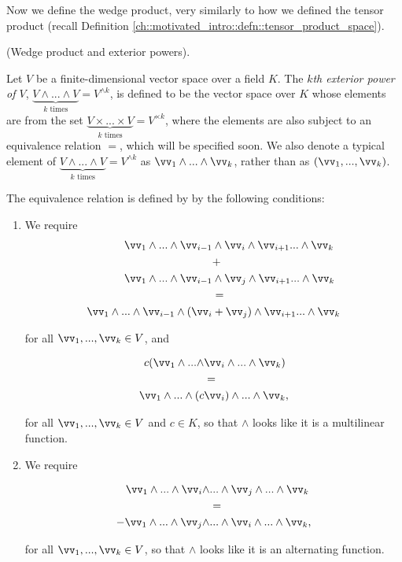 Now we define the wedge product, very similarly to how we defined the tensor product (recall Definition \ref{ch::motivated_intro::defn::tensor_product_space}).

\begin{defn}
    (Wedge product and exterior powers).
    
    Let $V$ be a finite-dimensional vector space over a field $K$. The \textit{$k$th exterior power of $V$}, $\underbrace{V \wedge ... \wedge V}_{\text{$k$ times}} = V^{\wedge k}$, is defined to be the vector space over $K$ whose elements are from the set $\underbrace{V \times ... \times V}_{\text{$k$ times}} = V^{\times k}$, where the elements are also subject to an equivalence relation $=$, which will be specified soon. We also denote a typical element of $\underbrace{V \wedge ... \wedge V}_{\text{$k$ times}} = V^{\wedge k}$ as $\vv_1 \wedge ... \wedge \vv_k$, rather than as $(\vv_1, ..., \vv_k)$. 
    
    The equivalence relation is defined by by the following conditions:
    
    \begin{enumerate}
        \item We require
        \begin{align*}
            \vv_1 \wedge ... \wedge \vv_{i - 1} &\wedge \vv_{i} \wedge \vv_{i + 1} ... \wedge \vv_k \\
            &+ \\
            \vv_1 \wedge ... \wedge \vv_{i - 1} &\wedge \vv_{j} \wedge \vv_{i + 1} ... \wedge \vv_k \\
            &= \\
            \vv_1 \wedge ... \wedge \vv_{i - 1} \wedge (\vv_{i} &+ \vv_{j}) \wedge \vv_{i + 1} ... \wedge \vv_k
        \end{align*}

        for all $\vv_1, ..., \vv_k \in V$, and
        
        \begin{align*}
            c (\vv_1 \wedge ... \wedge &\vv_i \wedge ... \wedge \vv_k ) \\
            &= \\
            \vv_1 \wedge ... \wedge (c &\vv_i) \wedge ... \wedge \vv_k,
        \end{align*}

        for all $\vv_1, ..., \vv_k \in V$ and $c \in K$, so that $\wedge$ looks like it is a multilinear function.

        \item We require

        \begin{align*}
            \vv_1 \wedge ... \wedge \vv_i \wedge &... \wedge \vv_j \wedge ... \wedge \vv_k \\
            &= \\
            -\vv_1 \wedge ... \wedge \vv_j \wedge &... \wedge \vv_i \wedge ... \wedge \vv_k,
        \end{align*}

        for all $\vv_1, ..., \vv_k \in V$, so that $\wedge$ looks like it is an alternating function.
    \end{enumerate}
\end{defn}

